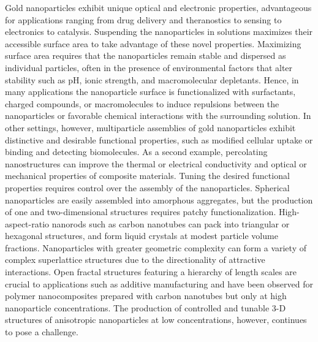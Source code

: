 \documentclass[journal=jacsat, superscriptaddress]{achemso}
\def\EDITSJCC#1{{\color{black}#1}}
\def\EDITSJCC#1{#1}
\begin{document}
Gold nanoparticles exhibit unique optical and electronic properties, advantageous for applications ranging from drug delivery and theranostics\cite{Alkilany2010,Choi2011} to sensing\cite{Saha2012} to electronics\cite{Romo-Herrera2011} to catalysis.\cite{Thompson2007} Suspending the nanoparticles in solutions maximizes their accessible surface area to take advantage of these novel properties. Maximizing surface area requires that the nanoparticles remain stable and dispersed as individual particles, often in the presence of environmental factors that alter stability such as pH,\cite{Orendorff2005,Nam2009} ionic strength,\cite{Boles2016} and macromolecular depletants\cite{Tam2010,Murthy2013}. Hence, in many applications the nanoparticle surface is functionalized with surfactants, charged compounds, or macromolecules to induce repulsions between the nanoparticles or favorable chemical interactions with the surrounding solution. In other settings, however, multiparticle assemblies of gold nanoparticles exhibit distinctive and desirable functional properties, such as modified cellular uptake\cite{Nam2009,Albanese2011} or binding and detecting biomolecules.\cite{Schwartzberg2004} \EDITSJCC{As a second example, percolating nanostructures can improve the thermal or electrical conductivity and optical or mechanical properties of composite materials.\cite{Paul2008,Kumar2010}} Tuning the desired functional properties requires control over the assembly of the nanoparticles. Spherical nanoparticles are easily assembled into amorphous aggregates,\cite{Dimon1986,Lin1989,Boal2000} but the production of one and two-dimensional structures requires patchy functionalization.\cite{Akcora2009,Kumar2013} High-aspect-ratio nanorods such as carbon nanotubes can pack into triangular or hexagonal structures,\cite{Frank1998,Baranov2010,Park2010} and form liquid crystals at modest particle volume fractions.\cite{Song2003,Rai2006}  Nanoparticles with greater geometric complexity can form a variety of complex superlattice structures due to the directionality of attractive interactions.\cite{Zanella2011,Young2013} Open fractal structures featuring a hierarchy of length scales are crucial to applications such as additive manufacturing\cite{Smay2002} and have been observed for polymer nanocomposites prepared with carbon nanotubes but only at high nanoparticle concentrations.\cite{Chatterjee2008} The production of controlled and tunable 3-D structures of anisotropic nanoparticles at low concentrations, however, continues to pose a challenge. 
\end{document}
